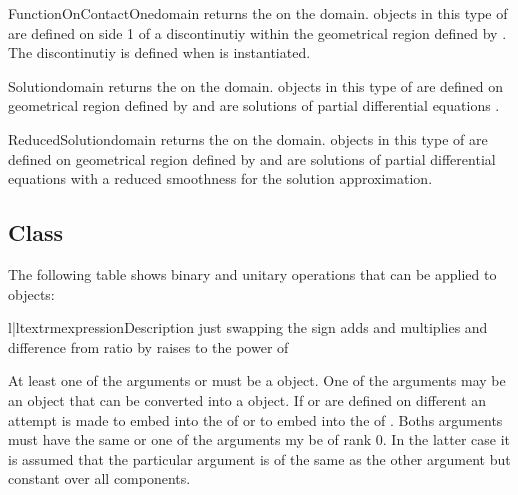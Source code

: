 \begin{funcdesc}{FunctionOnContactOne}{domain}
returns the \FunctionOnContactOne on the \Domain domain. 
\Data objects in this type of \Function
are defined on side 1 of a discontinutiy  within the geometrical region defined by .
The discontinutiy is defined when  is instantiated.
\end{funcdesc}

\begin{funcdesc}{Solution}{domain}
returns the \SolutionFS on the \Domain domain. \Data objects in this type of \Function
are defined on geometrical region defined by  and are solutions of
partial differential equations . 
\end{funcdesc}

\begin{funcdesc}{ReducedSolution}{domain}
returns the \ReducedSolutionFS on the \Domain domain. \Data objects in this type of \Function
are defined on geometrical region defined by  and are solutions of
partial differential equations  with a reduced smoothness 
for the solution approximation.
\end{funcdesc}

\subsection{\Data Class}
\label{SEC ESCRIPT DATA}

The following table shows binary and unitary operations that can be applied to
\Data objects:
\begin{tableii}{l|l}{textrm}{expression}{Description}
 {just  \index{+}}
 {swapping the sign\index{-}}
 {adds  and  \index{+}}
 {multiplies  and  \index{*}}
 {difference  from \index{-}}
 {ratio  by  \index{/}}
 {raises  to the power of  \index{**}}
\end{tableii}
At least one of the arguments  or  must be a
\Data object. One of the arguments may be an object that can be
converted into a \Data object. If  or  are
defined on different \FunctionSpace an attempt is made to embed 
into the \FunctionSpace of  or to embed  into
the \FunctionSpace of . Boths arguments must have the same
\Shape or one of the arguments my be of rank 0. In the
latter case it is assumed that the particular argument is of the same
\Shape as the other argument but constant over all components.

